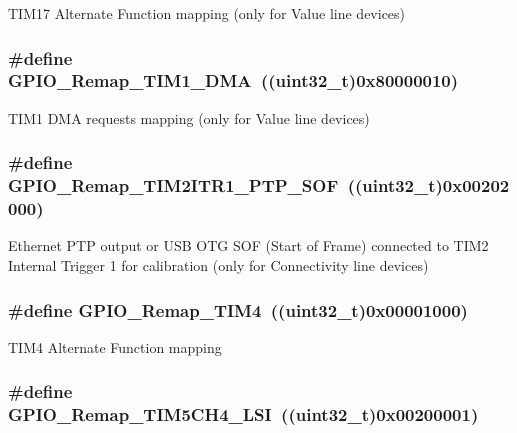 \label{group__GPIO__Remap__define_ga9fe98e01f8837d6a1ac4b4833f0fc45e}
TIM17 Alternate Function mapping (only for Value line devices) \hypertarget{group__GPIO__Remap__define_ga255adf908d7d530267707fee39ba2026}{
\subsubsection[{GPIO\_\-Remap\_\-TIM1\_\-DMA}]{\setlength{\rightskip}{0pt plus 5cm}\#define GPIO\_\-Remap\_\-TIM1\_\-DMA~((uint32\_\-t)0x80000010)}}
\label{group__GPIO__Remap__define_ga255adf908d7d530267707fee39ba2026}
TIM1 DMA requests mapping (only for Value line devices) \hypertarget{group__GPIO__Remap__define_ga0dc4bec540b9372479e63295fe68ac17}{
\subsubsection[{GPIO\_\-Remap\_\-TIM2ITR1\_\-PTP\_\-SOF}]{\setlength{\rightskip}{0pt plus 5cm}\#define GPIO\_\-Remap\_\-TIM2ITR1\_\-PTP\_\-SOF~((uint32\_\-t)0x00202000)}}
\label{group__GPIO__Remap__define_ga0dc4bec540b9372479e63295fe68ac17}
Ethernet PTP output or USB OTG SOF (Start of Frame) connected to TIM2 Internal Trigger 1 for calibration (only for Connectivity line devices) \hypertarget{group__GPIO__Remap__define_ga041b2f02b32895ce34bcd7499c9e873f}{
\subsubsection[{GPIO\_\-Remap\_\-TIM4}]{\setlength{\rightskip}{0pt plus 5cm}\#define GPIO\_\-Remap\_\-TIM4~((uint32\_\-t)0x00001000)}}
\label{group__GPIO__Remap__define_ga041b2f02b32895ce34bcd7499c9e873f}
TIM4 Alternate Function mapping \hypertarget{group__GPIO__Remap__define_gad909488d0b7a0cfa1116a66e962e3c62}{
\subsubsection[{GPIO\_\-Remap\_\-TIM5CH4\_\-LSI}]{\setlength{\rightskip}{0pt plus 5cm}\#define GPIO\_\-Remap\_\-TIM5CH4\_\-LSI~((uint32\_\-t)0x00200001)}}
